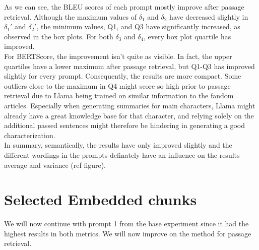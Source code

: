As we can see, the BLEU scores of each prompt mostly improve after passage retrieval. Although the maximum values of $\delta_{1}$ and $\delta_{2}$ have decreased slightly in $\delta_{1}'$ and $\delta_{2}'$, the minimum values, Q1, and Q3 have significantly increased, as observed in the box plots. For both $\delta_{3}$ and $\delta_{4}$, every box plot quartile has improved.\\

For BERTScore, the improvement isn't quite as visible. In fact, the upper quartiles have a lower maximum after passage retrieval, but Q1-Q3 has improved slightly for every prompt. Consequently, the results are more compact. Some outliers close to the maximum in Q4 might score so high prior to passage retrieval due to Llama being trained on similar information to the fandom articles. Especially when generating summaries for main characters, Llama might already have a great knowledge base for that character, and relying solely on the additional passed sentences might therefore be hindering in generating a good characterization.\\

In summary, semantically, the results have only improved slightly and the different wordings in the prompts definately have an influence on the results average and variance (ref figure).



\newpage
\section{Selected Embedded chunks}

We will now continue with prompt 1 from the base experiment since it had the highest results in both metrics. We will now improve on the method for passage retrieval.